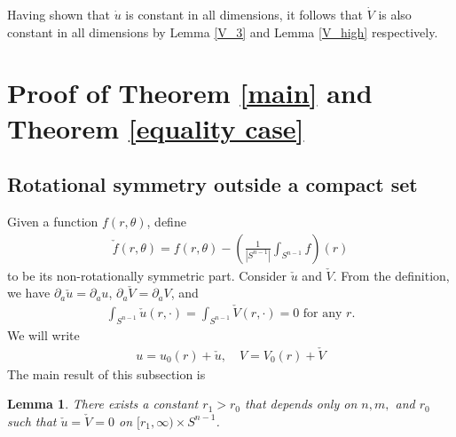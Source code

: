 \documentclass[12pt,twoside]{article}
\theoremstyle{plain}
\newtheorem{lem}[theorem]{Lemma}
\theoremstyle{definition}
\theoremstyle{remark}
\newcommand{\pl}{\partial}
\newcommand{\lt}{\left}
\newcommand{\rt}{\right}
\newcommand{\cu}{\check{u}}
\newcommand{\cV}{\check{V}}
\numberwithin{equation}{section}
\begin{document}
Having shown that $\dot u$ is constant in all dimensions, it follows that $\dot V $ is also constant in all dimensions by Lemma \ref{V_3} and Lemma \ref{V_high} respectively.
 
\section{Proof of Theorem \ref{main} and Theorem \ref{equality case}}\label{section:proof of main theorem}
\subsection{Rotational symmetry outside a compact set}
Given a function $f(r,\theta)$, define 
\begin{align*}
\check f(r,\theta) = f(r,\theta) - \lt( \frac{1}{|S^{n-1}|} \int_{S^{n-1}} f \rt)(r)
\end{align*}
to be its non-rotationally symmetric part. Consider $\check u$ and $\check V$. From the definition, we have $\pl_a \check u = \pl_a u$, $\pl_a \check V = \pl_a V$, and  \begin{align}\label{cucV no 0 mode}
\int_{S^{n-1}} \check u(r, \cdot) = \int_{S^{n-1}} \check V(r, \cdot)=0 \mbox{ for any } r.
\end{align} 
We will write 
\begin{align*}
u = u_0(r) + \check u, \quad V = V_0(r) + \check V
\end{align*}
The main result of this subsection is
\begin{lem}\label{vanish out a compact set}
There exists a constant $r_1 > r_0$ that depends only on $n,m,$ and $r_0$ such that $\cu = \cV =0$ on $[r_1,\infty) \times S^{n-1}$.
\end{lem}
\end{document}
